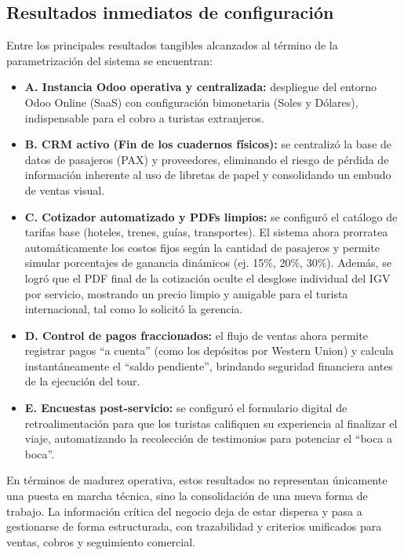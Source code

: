 \subsection{Resultados inmediatos de configuración}
\begin{indentedsubsection}
Entre los principales resultados tangibles alcanzados al término de la parametrización del sistema se encuentran:

\begin{itemize}
    \item \textbf{A. Instancia Odoo operativa y centralizada:} despliegue del entorno Odoo Online (SaaS) con configuración bimonetaria (Soles y Dólares), indispensable para el cobro a turistas extranjeros.
    \item \textbf{B. CRM activo (Fin de los cuadernos físicos):} se centralizó la base de datos de pasajeros (PAX) y proveedores, eliminando el riesgo de pérdida de información inherente al uso de libretas de papel y consolidando un embudo de ventas visual.
    \item \textbf{C. Cotizador automatizado y PDFs limpios:} se configuró el catálogo de tarifas base (hoteles, trenes, guías, transportes). El sistema ahora prorratea automáticamente los costos fijos según la cantidad de pasajeros y permite simular porcentajes de ganancia dinámicos (ej. 15\%, 20\%, 30\%). Además, se logró que el PDF final de la cotización oculte el desglose individual del IGV por servicio, mostrando un precio limpio y amigable para el turista internacional, tal como lo solicitó la gerencia.
    \item \textbf{D. Control de pagos fraccionados:} el flujo de ventas ahora permite registrar pagos ``a cuenta'' (como los depósitos por Western Union) y calcula instantáneamente el ``saldo pendiente'', brindando seguridad financiera antes de la ejecución del tour.
    \item \textbf{E. Encuestas post-servicio:} se configuró el formulario digital de retroalimentación para que los turistas califiquen su experiencia al finalizar el viaje, automatizando la recolección de testimonios para potenciar el ``boca a boca''.
\end{itemize}

En términos de madurez operativa, estos resultados no representan únicamente una puesta en marcha técnica, sino la consolidación de una nueva forma de trabajo. La información crítica del negocio deja de estar dispersa y pasa a gestionarse de forma estructurada, con trazabilidad y criterios unificados para ventas, cobros y seguimiento comercial.
\end{indentedsubsection}

